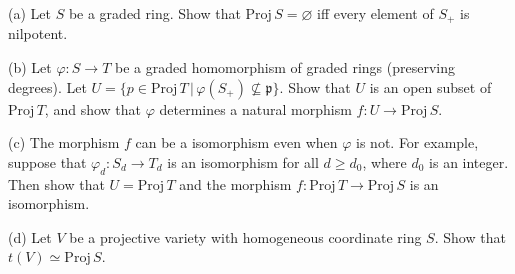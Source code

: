 \begin{exe}
	\label{2.2.14}
	(a) Let $S$ be a graded ring. Show that $\mathrm{Proj}\, S = \varnothing$ iff every element of $S_{+}$ is nilpotent.
	
	(b) Let $\varphi  : S \to T$ be a graded homomorphism of graded rings (preserving degrees). Let $U = \{ p \in \mathrm{Proj}\, T\, |\, \varphi(S_{+}) \not\subseteq \mathfrak{p} \}$. Show that $U$ is an open subset of $\mathrm{Proj}\, T$, and show that $\varphi$ determines a natural morphism $f : U \to \mathrm{Proj}\, S$.
	
	(c) The morphism $f$ can be a isomorphism even when $\varphi$ is not. For example, suppose that $\varphi_{d} : S_{d} \to T_{d}$ is an isomorphism for all $d \geq d_{0}$, where $d_{0}$ is an integer. Then show that $U = \mathrm{Proj}\, T$ and the morphism $f : \mathrm{Proj}\, T \to \mathrm{Proj}\, S$ is an isomorphism.
	
	(d) Let $V$ be a projective variety with homogeneous coordinate ring $S$. Show that $t(V) \simeq \mathrm{Proj}\, S$.
\end{exe}

